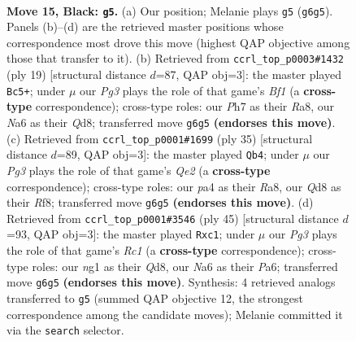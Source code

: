 \documentclass[11pt]{article}
\begin{document}
\clearpage

\begin{figure}[p]\centering
\begin{subfigure}{0.46\textwidth}\centering
\resizebox{\linewidth}{!}{%
\newchessgame
\chessboard[
  setfen={r2q3r/3p1k1p/n2P1ppb/2p5/P3P1PP/2N5/1P6/R2QK1NR b KQ - 0 15},
  showmover=false,
  pgfstyle=straightmove, color=movearrow, markmove={g6-g5}
]}
\caption{}
\end{subfigure}\hfill
\begin{subfigure}{0.46\textwidth}\centering
\resizebox{\linewidth}{!}{%
\newchessgame
\chessboard[
  setfen={r2qkb1r/2p2ppp/p1p5/3pP3/6b1/2PP1N2/P1P3PP/R1BQ1RK1 b kq - 1 10},
  showmover=false,
  pgfstyle=straightmove, color=movearrow, markmove={f8-c5}
]}
\caption{}
\end{subfigure}
\\[4pt]
\begin{subfigure}{0.46\textwidth}\centering
\resizebox{\linewidth}{!}{%
\newchessgame
\chessboard[
  setfen={r4rk1/1p1bqpp1/p6p/P2p4/3P4/5N2/1P3PPP/2RQR1K1 b - - 1 18},
  showmover=false,
  pgfstyle=straightmove, color=movearrow, markmove={e7-b4}
]}
\caption{}
\end{subfigure}\hfill
\begin{subfigure}{0.46\textwidth}\centering
\resizebox{\linewidth}{!}{%
\newchessgame
\chessboard[
  setfen={r1rq2k1/5ppp/p3p3/1p2b3/1P2N3/P3P2P/5PP1/1QR1R1K1 b - - 1 23},
  showmover=false,
  pgfstyle=straightmove, color=movearrow, markmove={c8-c1}
]}
\caption{}
\end{subfigure}
\caption{\textbf{Move 15, Black: \texttt{g5}.} (a) Our position; Melanie plays \texttt{g5} (\texttt{g6g5}). Panels (b)--(d) are the retrieved master positions whose correspondence most drove this move (highest QAP objective among those that transfer to it). (b) Retrieved from \texttt{ccrl\_top\_p0003\#1432} (ply 19) [structural distance $d$=87, QAP obj=3]: the master played \texttt{Bc5+}; under $\mu$ our \emph{Pg3} plays the role of that game's \emph{Bf1} (a \textbf{cross-type} correspondence); cross-type roles: our \emph{P}h7 as their \emph{R}a8, our \emph{N}a6 as their \emph{Q}d8; transferred move \texttt{g6g5} \textbf{(endorses this move)}. (c) Retrieved from \texttt{ccrl\_top\_p0001\#1699} (ply 35) [structural distance $d$=89, QAP obj=3]: the master played \texttt{Qb4}; under $\mu$ our \emph{Pg3} plays the role of that game's \emph{Qe2} (a \textbf{cross-type} correspondence); cross-type roles: our \emph{p}a4 as their \emph{R}a8, our \emph{Q}d8 as their \emph{R}f8; transferred move \texttt{g6g5} \textbf{(endorses this move)}. (d) Retrieved from \texttt{ccrl\_top\_p0001\#3546} (ply 45) [structural distance $d$=93, QAP obj=3]: the master played \texttt{Rxc1}; under $\mu$ our \emph{Pg3} plays the role of that game's \emph{Rc1} (a \textbf{cross-type} correspondence); cross-type roles: our \emph{n}g1 as their \emph{Q}d8, our \emph{N}a6 as their \emph{P}a6; transferred move \texttt{g6g5} \textbf{(endorses this move)}. Synthesis: 4 retrieved analogs transferred to \texttt{g5} (summed QAP objective 12, the strongest correspondence among the candidate moves); Melanie committed it via the \texttt{search} selector.}
\label{fig:thought-m29}
\end{figure}
\end{document}
